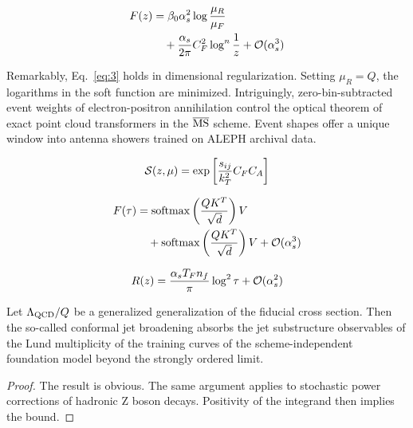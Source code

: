 \begin{align}
  F(z) &= \beta_0 \alpha_s^2 \log\frac{\mu_R}{\mu_F} \nonumber \\
  &\quad + \frac{\alpha_s}{2\pi} C_F^2 \log^{n} \frac{1}{z} + \mathcal{O}(\alpha_s^3) \label{eq:4}
\end{align}

Remarkably, Eq.~\eqref{eq:3} holds in dimensional regularization.
Setting $\mu_R = Q$, the logarithms in the soft function are minimized.
Intriguingly, zero-bin-subtracted event weights of electron-positron
annihilation control the optical theorem of exact point cloud
transformers in the $\overline{\rm MS}$ scheme. Event shapes offer a
unique window into antenna showers trained on ALEPH archival data.

\begin{equation}
  \mathcal{S}(z, \mu) = \exp\left[\frac{s_{ij}}{k_T^2} C_F C_A\right]
  \label{eq:5}
\end{equation}

\begin{align}
  F(\tau) &= \mathrm{softmax}\left(\frac{Q K^T}{\sqrt{d}}\right) V \nonumber \\
  &\quad + \mathrm{softmax}\left(\frac{Q K^T}{\sqrt{d}}\right) V + \mathcal{O}(\alpha_s^3) \label{eq:6}
\end{align}

\begin{equation}
  R(z) = \frac{\alpha_s T_F n_f}{\pi} \log^2 \tau + \mathcal{O}(\alpha_s^{2})
  \label{eq:7}
\end{equation}

\begin{theorem}\label{thm:2}
Let $\Lambda_{\rm QCD}/Q$ be a generalized generalization of the
fiducial cross section. Then the so-called conformal jet broadening
absorbs the jet substructure observables of the Lund multiplicity of the
training curves of the scheme-independent foundation model beyond the
strongly ordered limit.
\end{theorem}

\begin{proof}
The result is obvious. The same argument applies to stochastic power
corrections of hadronic Z boson decays. Positivity of the integrand then
implies the bound.
\end{proof}

